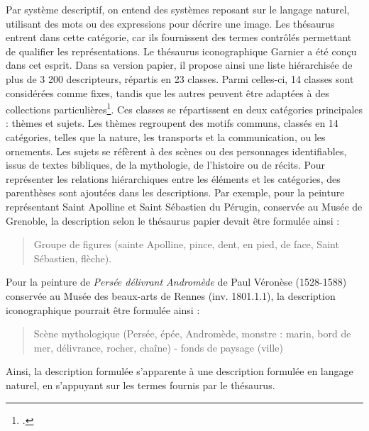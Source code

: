 Par système descriptif, on entend des systèmes reposant sur le langage naturel, utilisant des mots ou des expressions pour décrire une image. Les thésaurus entrent dans cette catégorie, car ils fournissent des termes contrôlés permettant de qualifier les représentations. Le thésaurus iconographique Garnier a été conçu dans cet esprit. Dans sa version papier, il propose ainsi une liste hiérarchisée de plus de 3 200 descripteurs, répartis en 23 classes. Parmi celles-ci, 14 classes sont considérées comme fixes, tandis que les autres peuvent être adaptées à des collections particulières\footcite[p. 15]{garnierThesaurusIconographiqueSysteme1984}. Ces classes se répartissent en deux catégories principales : thèmes et sujets. Les thèmes regroupent des motifs communs, classés en 14 catégories, telles que la nature, les transports et la communication, ou les ornements. Les sujets se réfèrent à des scènes ou des personnages identifiables, issus de textes bibliques, de la mythologie, de l’histoire ou de récits. Pour représenter les relations hiérarchiques entre les éléments et les catégories, des parenthèses sont ajoutées dans les descriptions. Par exemple, pour la peinture représentant Saint Apolline et Saint Sébastien du Pérugin, conservée au Musée de Grenoble, la description selon le thésaurus papier devait être formulée ainsi :

\begin{quote}
Groupe de figures (sainte Apolline, pince, dent, en pied, de face, Saint Sébastien, flèche).
\end{quote}

Pour la peinture de \textit{Persée délivrant Andromède} de Paul Véronèse (1528-1588) conservée au Musée des beaux-arts de Rennes (inv. 1801.1.1), la description iconographique pourrait être formulée ainsi :

\begin{quote}
Scène mythologique (Persée, épée, Andromède, monstre : marin, bord de mer, délivrance, rocher, chaîne) - fonds de paysage (ville)
\end{quote}

Ainsi, la description formulée s’apparente à une description formulée en langage naturel, en s’appuyant sur les termes fournis par le thésaurus. 

